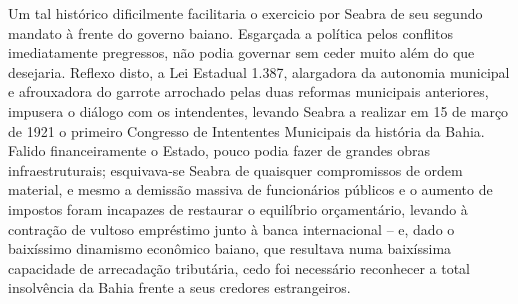 Um tal histórico dificilmente facilitaria o exercicio por Seabra de seu segundo mandato à frente do governo baiano. Esgarçada a política pelos conflitos imediatamente pregressos, não podia governar sem ceder muito além do que desejaria. Reflexo disto, a Lei Estadual 1.387, alargadora da autonomia municipal e afrouxadora do garrote arrochado pelas duas reformas municipais anteriores, impusera o diálogo com os intendentes, levando Seabra a realizar em 15 de março de 1921 o primeiro Congresso de Intententes Municipais da história da Bahia. Falido financeiramente o Estado, pouco podia fazer de grandes obras infraestruturais; esquivava-se Seabra de quaisquer compromissos de ordem material, e mesmo a demissão massiva de funcionários públicos e o aumento de impostos foram incapazes de restaurar o equilíbrio orçamentário, levando à contração de vultoso empréstimo junto à banca internacional -- e, dado o baixíssimo dinamismo econômico baiano, que resultava numa baixíssima capacidade de arrecadação tributária, cedo foi necessário reconhecer a total insolvência da Bahia frente a seus credores estrangeiros. 

